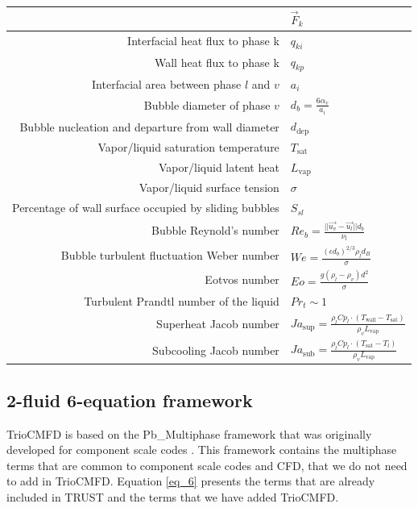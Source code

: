 \begin{center}
\begin{tabular}{|r|l|}
		& $\vec{F}_k$  \\ \hline
	Interfacial heat flux to phase k
		& $q_{ki}$ \\ \hline
	Wall heat flux to phase k
		& $q_{kp} $ \\ \hline
	Interfacial area between phase $l$ and $v$
		& $a_i$ \\ \hline
	Bubble diameter of phase $v$
		& $	d_b = \frac{6 \alpha_v}{a_i} $ \\ \hline
	Bubble nucleation and departure from wall diameter
		& $d_\text{dep}$ \\ \hline
	Vapor/liquid saturation temperature
		& $T_\text{sat}$ \\ \hline
	Vapor/liquid latent heat
		& $L_\text{vap}$ \\ \hline
	Vapor/liquid surface tension
		& $\sigma$ \\ \hline
	Percentage of wall surface occupied by sliding bubbles
		& $S_{sl}$ \\ \hline
	Bubble Reynold's number
		& $Re_b = \frac{||\overrightarrow{u_v}-\overrightarrow{u_l}|| d_b}{\nu_l}$ \\ \hline
	Bubble turbulent fluctuation Weber number
		& $We = \frac{(\epsilon d_b)^{2/3} \rho_l d_B}{\sigma}$ \\ \hline
	Eotvos number
		&  $Eo = \frac{g(\rho_l-\rho_v)d^2}{\sigma}$ \\ \hline
	Turbulent Prandtl number of the liquid 
		& $Pr_t \sim 1 $ \\ \hline
	Superheat Jacob number
		& $Ja_\text{sup} = \frac{\rho_l Cp_l \cdot (T_\text{wall} - T_\text{sat})}{\rho_v L_\text{vap}}$ \\ \hline
	Subcooling Jacob number	
		& $Ja_\text{sub} = \frac{\rho_l Cp_l \cdot (T_\text{sat} - T_l)}{\rho_v L_\text{vap}}$ \\ \hline


\end{tabular}
\end{center}
\pagebreak

\subsection{2-fluid 6-equation framework}

TrioCMFD is based on the Pb\_Multiphase framework that was originally developed for component scale codes \cite{Gerschenfeld_PolyMAC2018, Gerschenfeld_PolyMAC2022}.
This framework contains the multiphase terms that are common to component scale codes and CFD, that we do not need to add in TrioCMFD. 
Equation \eqref{eq_6} presents the terms that are already included in TRUST and the terms that we have added TrioCMFD.

